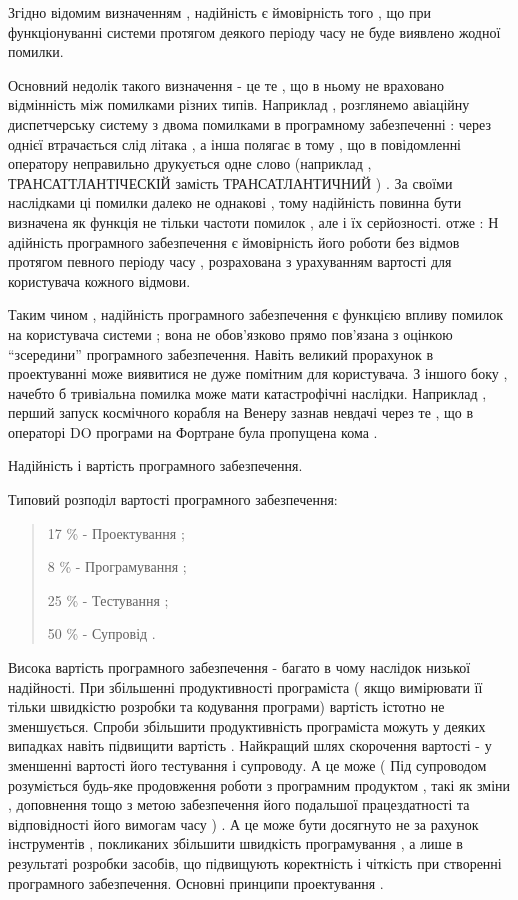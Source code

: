 \documentclass[oneside,final,14pt]{extreport}
\begin{document}
Згідно відомим визначенням , надійність є ймовірність того , що при функціонуванні системи протягом деякого періоду часу не буде виявлено жодної помилки.

Основний недолік такого визначення - це те , що в ньому не враховано відмінність між помилками різних типів. Наприклад , розглянемо авіаційну диспетчерську систему з двома помилками в програмному забезпеченні : через однієї втрачається слід літака , а інша полягає в тому , що в повідомленні оператору неправильно друкується одне слово (наприклад , ТРАНСАТТЛАНТІЧЕСКІЙ замість ТРАНСАТЛАНТИЧНИЙ ) . За своїми наслідками ці помилки далеко не однакові , тому надійність повинна бути визначена як функція не тільки частоти помилок , але і їх серйозності. отже :
Н
адійність програмного забезпечення є ймовірність його роботи без відмов протягом певного періоду часу , розрахована з урахуванням вартості для користувача кожного відмови.

Таким чином , надійність програмного забезпечення є функцією впливу помилок на користувача системи ; вона не обов'язково прямо пов'язана з оцінкою ``зсередини'' програмного забезпечення. Навіть великий прорахунок в проектуванні може виявитися не дуже помітним для користувача. З іншого боку , начебто б тривіальна помилка може мати катастрофічні наслідки. Наприклад , перший запуск космічного корабля на Венеру зазнав невдачі через те , що в операторі DO програми на Фортране була пропущена кома .

Надійність і вартість програмного забезпечення.

Типовий розподіл вартості програмного забезпечення:
\begin{quote}

17 \% - Проектування ;

8 \% - Програмування ;

25 \% - Тестування ;

50 \% - Супровід .
\end{quote}

Висока вартість програмного забезпечення - багато в чому наслідок низької надійності. При збільшенні продуктивності програміста ( якщо вимірювати її тільки швидкістю розробки та кодування програми) вартість істотно не зменшується. Спроби збільшити продуктивність програміста можуть у деяких випадках навіть підвищити вартість . Найкращий шлях скорочення вартості - у зменшенні вартості його тестування і супроводу. А це може ( Під супроводом розуміється будь-яке продовження роботи з програмним продуктом , такі як зміни , доповнення тощо з метою забезпечення його подальшої працездатності та відповідності його вимогам часу ) . А це може бути досягнуто не за рахунок інструментів , покликаних збільшити швидкість програмування , а лише в результаті розробки засобів, що підвищують коректність і чіткість при створенні програмного забезпечення.
Основні принципи проектування .
\end{document}
